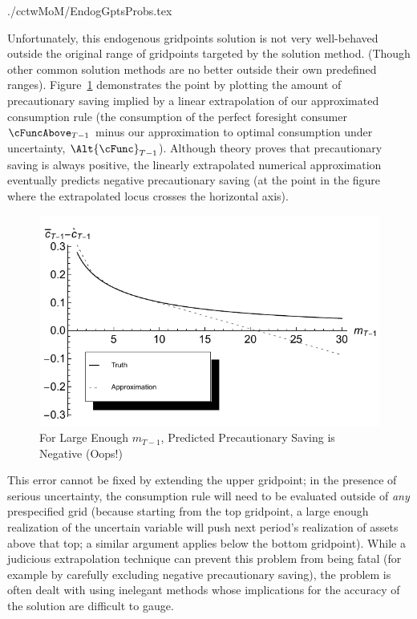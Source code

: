 \documentclass[titlepage, headings=optiontotocandhead]{\econtex}
\begin{document}
\begin{verbatimwrite}{./cctwMoM/EndogGptsProbs.tex}

  Unfortunately, this endogenous gridpoints solution is not very
  well-behaved outside the original range of gridpoints targeted by
  the solution method.  (Though other common solution methods are no
  better outside their own predefined ranges).
  Figure~\ref{fig:ExtrapProblem} demonstrates the point by plotting
  the amount of precautionary saving implied by a linear extrapolation
  of our approximated consumption rule (the consumption of the perfect
  foresight consumer $\cFuncAbove_{T-1}$ minus our approximation to
  optimal consumption under uncertainty, $\Alt{\cFunc}_{T-1}$).
  Although theory proves that precautionary saving is always positive,
  the linearly extrapolated numerical approximation eventually
  predicts negative precautionary saving (at the point in the figure
  where the extrapolated locus crosses the horizontal axis).

  \hypertarget{ExtrapProblemPlot}{}
  \begin{figure}
    \includegraphics{./Figures/ExtrapProblemPlot}
    \caption{For Large Enough ${m}_{T-1}$, Predicted Precautionary Saving is Negative (Oops!)}
    \label{fig:ExtrapProblem}
  \end{figure}

  This error cannot be fixed by extending the upper gridpoint; in the
  presence of serious uncertainty, the consumption rule will need to be
  evaluated outside of \textit{any} prespecified grid (because starting
  from the top gridpoint, a large enough realization of the uncertain
  variable will push next period's realization of assets above that
  top; a similar argument applies below the bottom gridpoint).  While a judicious extrapolation technique can prevent this
  problem from being fatal (for example by carefully excluding negative
  precautionary saving), the problem is often dealt with using inelegant
  methods whose implications for the accuracy of the solution are
  difficult to gauge.
\end{verbatimwrite}
\unskip
\end{document}
